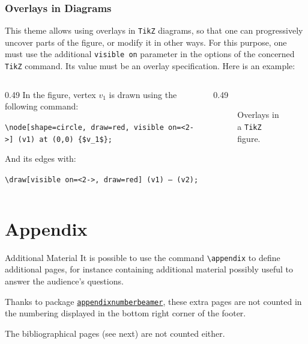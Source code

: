 \documentclass[10pt,    %
    english,            %
    xcolor=table,       %
    envcountsect,       %
    aspectratio=43      %
]{beamer}
\begin{document}
\begin{frame}
    \frametitle{Overlays in Diagrams}
    This theme allows using overlays in \texttt{TikZ} diagrams, so that one can progressively uncover parts of the figure, or modify it in other ways. For this purpose, one must use the additional \texttt{visible on} parameter in the options of the concerned \texttt{TikZ} command. Its value must be an overlay specification. Here is an example:
    
    \begin{columns}[totalwidth=\textwidth]
        \begin{column}{0.49\textwidth}
            In the figure, vertex $v_1$ is drawn using the following command:

            \texttt{\textbackslash{}node[shape=circle, draw=red, \alert{visible on=<2->}] (v1) at (0,0) \{\$v\_1\$\};}
            
            \medskip
            And its edges with:
	        
	        \texttt{\textbackslash{}draw[\alert{visible on=<2->}, draw=red] (v1) -- (v2);}
        \end{column}
        \begin{column}{0.49\textwidth}
            \begin{figure}[H]
                \centering
                \resizebox{0.6\linewidth}{!}{}
                \caption{Overlays in a \texttt{TikZ} figure.}
                \label{fig:overlays}
            \end{figure}
        \end{column}
    \end{columns}
\end{frame}












\appendix
\section{Appendix}
\sectionframe

\begin{frame}{Additional Material}
	It is possible to use the command \texttt{\textbackslash{}appendix} to define additional pages, for instance containing additional material possibly useful to answer the audience's questions. 
	
    \medskip
	Thanks to package \href{https://ctan.org/pkg/appendixnumberbeamer?lang=en}{\texttt{appendixnumberbeamer}}, these extra pages are not counted in the numbering displayed in the bottom right corner of the footer.
	
    \medskip
	The bibliographical pages (see next) are not counted either.
\end{frame}
\end{document}
